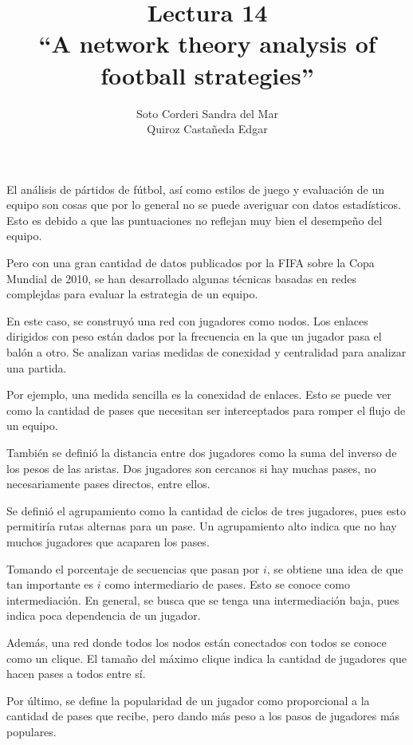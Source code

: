 \documentclass[12pt, letterpaper]{article}
\title{
    Lectura 14\\ 
    ``A network theory analysis of football strategies''
}
\author{
    Soto Corderi Sandra del Mar\\
    Quiroz Castañeda Edgar \\
}
\begin{document}
    \maketitle

    El análisis de pártidos de fútbol, así como estilos de juego y evaluación 
    de un equipo son cosas que por lo general no se puede averiguar con datos 
    estadísticos. Esto es debido a que las puntuaciones no reflejan muy bien el 
    desempeño del equipo. 

    Pero con una gran cantidad de datos publicados por la FIFA sobre la Copa 
    Mundial de 2010, se han desarrollado algunas técnicas basadas en redes 
    complejdas para evaluar la estrategia de un equipo.

    En este caso, se construyó una red con jugadores como nodos. Los enlaces 
    dirigidos con peso están dados por la frecuencia en la que un jugador pasa 
    el balón a otro. Se analizan varias medidas de conexidad y centralidad para 
    analizar una partida.

    Por ejemplo, una medida sencilla es la conexidad de enlaces. Esto se puede 
    ver como la cantidad de pases que necesitan ser interceptados para romper el
    flujo de un equipo.

    También se definió la distancia entre dos jugadores como la suma del 
    inverso de los pesos de las aristas. Dos jugadores son cercanos si hay 
    muchas pases, no necesariamente pases directos, entre ellos.

    Se definió el agrupamiento como la cantidad de ciclos de tres jugadores, 
    pues esto permitiría rutas alternas para un pase. Un agrupamiento alto 
    indica que no hay muchos jugadores que acaparen los pases.

    Tomando el porcentaje de secuencias que pasan por $i$, se obtiene una idea 
    de que tan importante es $i$ como intermediario de pases. Esto se conoce 
    como intermediación. En general, se busca que se tenga una intermediación 
    baja, pues indica poca dependencia de un jugador.

    Además, una red donde todos los nodos están conectados con todos se 
    conoce como un clique. El tamaño del máximo clique indica la cantidad de 
    jugadores que hacen pases a todos entre sí.

    Por último, se define la popularidad de un jugador como proporcional a la 
    cantidad de pases que recibe, pero dando más peso a los pasos de jugadores 
    más populares.
\end{document}
